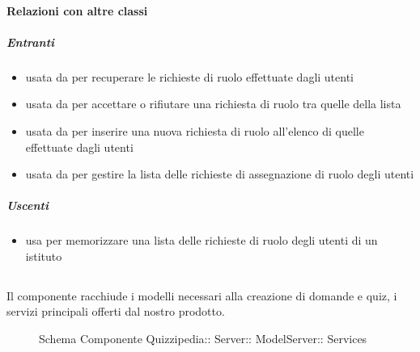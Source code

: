\paragraph{Relazioni con altre classi}
\subparagraph{Entranti}
\begin{itemize}
\item usata da  per recuperare le richieste di ruolo effettuate dagli utenti
\item usata da  per accettare o rifiutare una richiesta di ruolo tra quelle della lista
\item usata da  per inserire una nuova richiesta di ruolo all'elenco di quelle effettuate dagli utenti
\item usata da  per gestire la lista delle richieste di assegnazione di ruolo degli utenti
\end{itemize}
\subparagraph{Uscenti}
\begin{itemize}
\item usa  per memorizzare una lista delle richieste di ruolo degli utenti di un istituto
\end{itemize}
\subsection{}
Il componente racchiude i modelli necessari alla creazione di domande e quiz, i servizi principali offerti dal nostro prodotto.
\begin{figure}[H]
\centering
\noindent{}
\caption[Schema Componente Services]{Schema Componente Quizzipedia:: Server:: ModelServer:: Services}
\end{figure}
